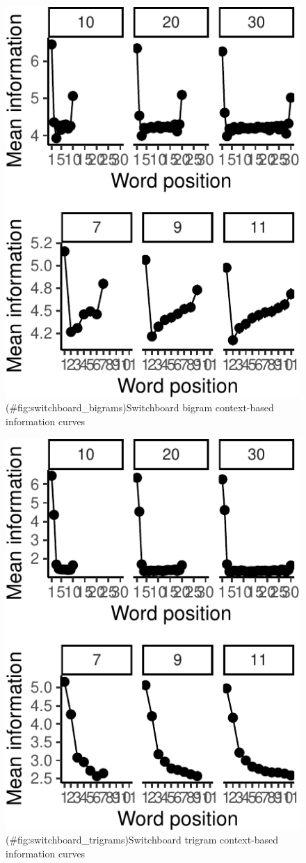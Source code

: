 \documentclass[man,floatsintext]{apa6}
\begin{document}
\begin{figure}
\centering
\includegraphics{figs/switchboard_bigrams-1.pdf}
\caption{(\#fig:switchboard\_bigrams)Switchboard bigram context-based information curves}
\end{figure}

\begin{figure}
\centering
\includegraphics{figs/switchboard_trigrams-1.pdf}
\caption{(\#fig:switchboard\_trigrams)Switchboard trigram context-based information curves}
\end{figure}
\end{document}
